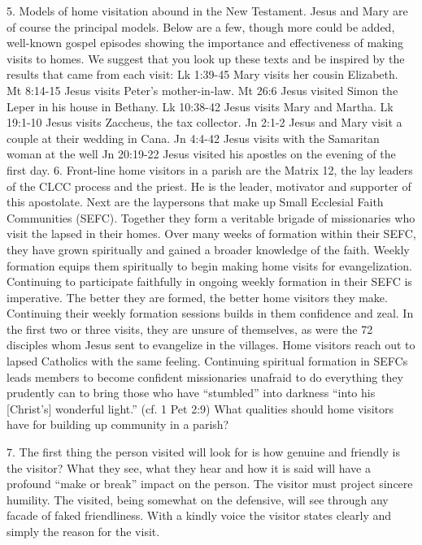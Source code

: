 \documentclass[oneside]{book}
\begin{document}
5. Models of home visitation abound in the New Testament. Jesus and Mary are of
course the principal models. Below are a few, though more could be added,
well-known gospel episodes showing the importance and effectiveness of making
visits to homes. We suggest that you look up these texts and be inspired by the
results that came from each visit:
Lk 1:39-45
Mary visits her cousin Elizabeth.
Mt 8:14-15
Jesus visits Peter's mother-in-law.
Mt 26:6
Jesus visited Simon the Leper in his house in Bethany.
Lk 10:38-42
Jesus visits Mary and Martha.
Lk 19:1-10
Jesus visits Zaccheus, the tax collector.
Jn 2:1-2
Jesus and Mary visit a couple at their wedding in Cana.
Jn 4:4-42
Jesus visits with the Samaritan woman at the well
Jn 20:19-22
Jesus visited his apostles on the evening of the first day.
6. Front-line home visitors in a parish are the Matrix 12, the lay leaders of
the CLCC process and the priest. He is the leader, motivator and supporter of
this apostolate. Next are the laypersons that make up Small Ecclesial Faith
Communities (SEFC). Together they form a veritable brigade of missionaries who
visit the lapsed in their homes. Over many weeks of formation within their SEFC,
they have grown spiritually and gained a broader knowledge of the faith. Weekly
formation equips them spiritually to begin making home visits for
evangelization. Continuing to participate faithfully in ongoing weekly formation
in their SEFC is imperative. The better they are formed, the better home
visitors they make. Continuing their weekly formation sessions builds in them
confidence and zeal.
In the first two or three visits, they are unsure of themselves, as were the 72
disciples whom Jesus sent to evangelize in the villages. Home visitors reach out
to lapsed Catholics with the same feeling. Continuing spiritual formation in
SEFCs leads members to become confident missionaries unafraid to do everything
they prudently can to bring those who have ``stumbled'' into darkness ``into his
[Christ's] wonderful light.'' (cf. 1 Pet 2:9)
What qualities should home visitors have for building up community in a parish?

7. The first thing the person visited will look for is how genuine and friendly
is the visitor? What they see, what they hear and how it is said will have a
profound ``make or break'' impact on the person. The visitor must project
sincere humility. The visited, being somewhat on the defensive, will see through
any facade of faked friendliness. With a kindly voice the visitor states clearly
and simply the reason for the visit.
\end{document}
